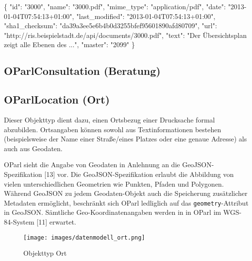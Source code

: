 \documentclass[,a4paper]{article}
\makeatletter
\newenvironment{Shaded}{}{}
\newcommand{\DataTypeTok}[1]{\textcolor[rgb]{0.56,0.13,0.00}{{#1}}}
\newcommand{\StringTok}[1]{\textcolor[rgb]{0.25,0.44,0.63}{{#1}}}
\newcommand{\NormalTok}[1]{{#1}}
\def\maxwidth{\ifdim\Gin@nat@width>\linewidth\linewidth
\else\Gin@nat@width\fi}
\let\Oldincludegraphics\includegraphics
\renewcommand{\includegraphics}[1]{\Oldincludegraphics[width=\maxwidth]{#1}}
\makeatother
\begin{document}
\begin{Shaded}
\begin{Highlighting}[]
\NormalTok{\{}
    \DataTypeTok{"id"}\NormalTok{: }\StringTok{"3000"}\NormalTok{,}
    \DataTypeTok{"name"}\NormalTok{: }\StringTok{"3000.pdf"}\NormalTok{,}
    \DataTypeTok{"mime_type"}\NormalTok{: }\StringTok{"application/pdf"}\NormalTok{,}
    \DataTypeTok{"date"}\NormalTok{: }\StringTok{"2013-01-04T07:54:13+01:00"}\NormalTok{,}
    \DataTypeTok{"last_modified"}\NormalTok{: }\StringTok{"2013-01-04T07:54:13+01:00"}\NormalTok{,}
    \DataTypeTok{"sha1_checksum"}\NormalTok{: }\StringTok{"da39a3ee5e6b4b0d3255bfef95601890afd80709"}\NormalTok{,}
    \DataTypeTok{"url"}\NormalTok{: }\StringTok{"http://ris.beispielstadt.de/api/documents/3000.pdf"}\NormalTok{,}
    \DataTypeTok{"text"}\NormalTok{: }\StringTok{"Der Übersichtsplan zeigt alle Ebenen des ..."}\NormalTok{,}
    \DataTypeTok{"master"}\NormalTok{: }\StringTok{"2099"}
\NormalTok{\}}
\end{Highlighting}
\end{Shaded}

\subsection{OParlConsultation (Beratung)}

\subsection{OParlLocation (Ort)}

Dieser Objekttyp dient dazu, einen Ortsbezug einer Drucksache formal
abzubilden. Ortsangaben können sowohl aus Textinformationen bestehen
(beispielsweise der Name einer Straße/eines Platzes oder eine genaue
Adresse) als auch aus Geodaten.

OParl sieht die Angabe von Geodaten in Anlehnung an die
GeoJSON-Spezifikation {[}13{]} vor. Die GeoJSON-Spezifikation erlaubt
die Abbildung von vielen unterschiedlichen Geometrien wie Punkten,
Pfaden und Polygonen. Während GeoJSON zu jedem Geodaten-Objekt auch die
Speicherung zusätzlicher Metadaten ermöglicht, beschränkt sich OParl
ledliglich auf das \texttt{geometry}-Attribut in GeoJSON. Sämtliche
Geo-Koordinatenangaben werden in in OParl im WGS-84-System {[}11{]}
erwartet.

\begin{figure}[htbp]
\centering
\texttt{[image: images/datenmodell\_ort.png]}
\caption{Objekttyp Ort}
\end{figure}
\end{document}
